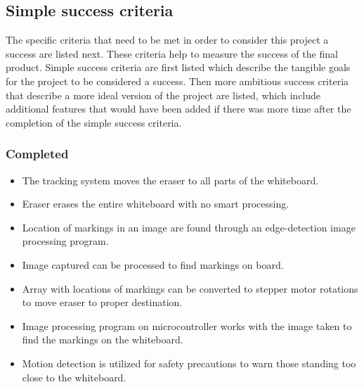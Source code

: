 \subsection{Simple success criteria}
\setlength{\parindent}{2.5ex} The specific criteria that need to be met in order to consider this project a success are listed next. These criteria help to measure the success of the final product. Simple success criteria are first listed which describe the tangible goals for the project to be considered a success. Then more ambitious success criteria that describe a more ideal version of the project are listed, which include additional features that would have been added if there was more time after the completion of the simple success criteria.\\

\subsubsection{Completed}
\begin{itemize}
\item The tracking system moves the eraser to all parts of the whiteboard.
\item Eraser erases the entire whiteboard with no smart processing.
\item Location of markings in an image are found through an edge-detection image processing program.
\item Image captured can be processed to find markings on board.
\item Array with locations of markings can be converted to stepper motor rotations to move eraser to proper destination.
\item Image processing program on microcontroller works with the image taken to find the markings on the whiteboard.\\
\item Motion detection is utilized for safety precautions to warn those standing too close to the whiteboard.
\end{itemize}

